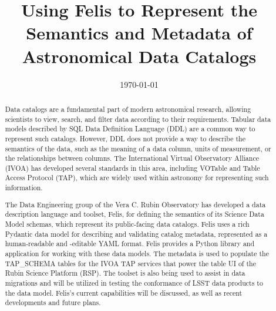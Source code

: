 \documentclass[11pt,twoside]{article}
\begin{document}

\date{\today}
\title{Using Felis to Represent the Semantics and Metadata of Astronomical Data Catalogs}



\begin{abstract}
    Data catalogs are a fundamental part of modern astronomical research, allowing scientists to view, search, and filter data according to their requirements. Tabular data models described by SQL Data Definition Language (DDL) are a common way to represent such catalogs. However, DDL does not provide a way to describe the semantics of the data, such as the meaning of a data column, units of measurement, or the relationships between columns. The International Virtual Observatory Alliance (IVOA) has developed several standards in this area, including VOTable and Table Access Protocol (TAP), which are widely used within astronomy for representing such information.

    The Data Engineering group of the Vera C. Rubin Observatory has developed a data description language and toolset, Felis, for defining the semantics of its Science Data Model schemas, which represent its public-facing data catalogs. Felis uses a rich Pydantic data model for describing and validating catalog metadata, represented as a human-readable and -editable YAML format. Felis provides a Python library and application for working with these data models. The metadata is used to populate the TAP\_SCHEMA tables for the IVOA TAP services that power the table UI of the Rubin Science Platform (RSP). The toolset is also being used to assist in data migrations and will be utilized in testing the conformance of LSST data products to the data model. Felis's current capabilities will be discussed, as well as recent developments and future plans.
\end{abstract}

\end{document}

